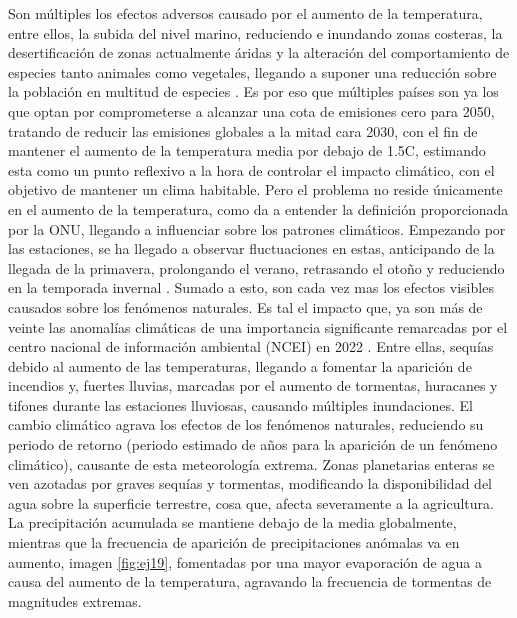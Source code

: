 Son múltiples los efectos adversos causado por el aumento de la temperatura, entre ellos, la subida del nivel marino, reduciendo e inundando zonas costeras, la desertificación de zonas actualmente áridas y la alteración del comportamiento de especies tanto animales como vegetales, llegando a suponer una reducción sobre la población en multitud de especies \cite{arnell2019global} \cite{new2011four}.\newline
\newline
Es por eso que múltiples países son ya los que optan por comprometerse a alcanzar una cota de emisiones cero para 2050, tratando de reducir las emisiones globales a la mitad cara 2030, con el fin de mantener el aumento de la temperatura media por debajo de 1.5\textdegree C, estimando esta como un punto reflexivo a la hora de controlar el impacto climático, con el objetivo de mantener un clima habitable.\newline
\newline
Pero el problema no reside únicamente en el aumento de la temperatura, como da a entender la definición proporcionada por la ONU, llegando a influenciar sobre los patrones climáticos. Empezando por las estaciones, se ha llegado a observar fluctuaciones en estas, anticipando de la llegada de la primavera, prolongando el verano, retrasando el otoño y reduciendo en la temporada invernal \cite{sparks2002observed}.\newline
\newline
Sumado a esto, son cada vez mas los efectos visibles causados sobre los fenómenos naturales. Es tal el impacto que, ya son más de veinte las anomalías climáticas de una importancia significante remarcadas por el centro nacional de información ambiental (NCEI) en 2022 \cite{NCEIWeb}. Entre ellas, sequías debido al aumento de las temperaturas, llegando a fomentar la aparición de incendios y, fuertes lluvias, marcadas por el aumento de tormentas, huracanes y tifones durante las estaciones lluviosas, causando múltiples inundaciones.\newline
\newline
El cambio climático agrava los efectos de los fenómenos naturales, reduciendo su periodo de retorno (periodo estimado de años para la aparición de un fenómeno climático), causante de esta meteorología extrema. Zonas planetarias enteras se ven azotadas por graves sequías y tormentas, modificando la disponibilidad del agua sobre la superficie terrestre, cosa que, afecta severamente a la agricultura. La precipitación acumulada se mantiene debajo de la media globalmente, mientras que la frecuencia de aparición de precipitaciones anómalas va en aumento, imagen \ref{fig:ej19}, fomentadas por una mayor evaporación de agua a causa del aumento de la temperatura, agravando la frecuencia de tormentas de magnitudes extremas. 

